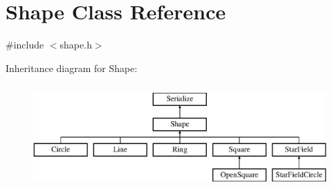 \hypertarget{classShape}{\section{Shape Class Reference}
\label{classShape}
}


{\ttfamily \#include $<$shape.\-h$>$}

Inheritance diagram for Shape\-:\begin{figure}[H]
\begin{center}
\leavevmode
\includegraphics[height=4.000000cm]{classShape}
\end{center}
\end{figure}
